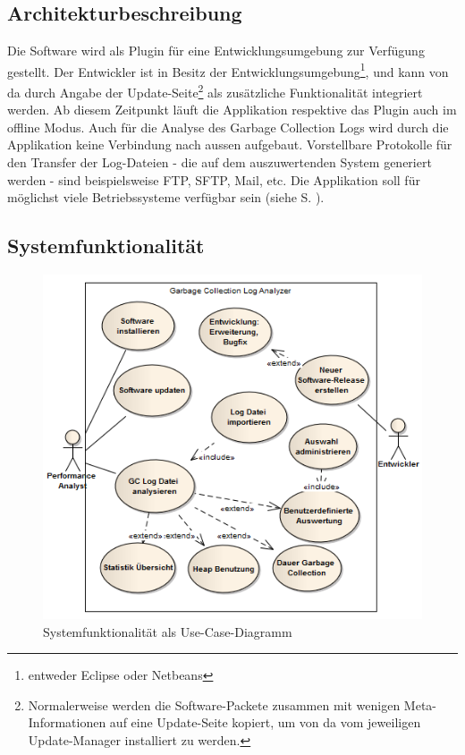 \subsection{Architekturbeschreibung}
Die Software wird als Plugin für eine Entwicklungsumgebung zur Verfügung gestellt. Der Entwickler ist in Besitz der Entwicklungsumgebung\footnote{entweder Eclipse oder Netbeans}, und kann von da durch Angabe der Update-Seite\footnote{Normalerweise werden die Software-Packete zusammen mit wenigen Meta-Informationen auf eine Update-Seite kopiert, um von da vom jeweiligen Update-Manager installiert zu werden.} als zusätzliche Funktionalität integriert werden. Ab diesem Zeitpunkt läuft die Applikation respektive das Plugin auch im offline Modus. Auch für die Analyse des Garbage Collection Logs wird durch die Applikation keine Verbindung nach aussen aufgebaut. Vorstellbare Protokolle für den Transfer der Log-Dateien - die auf dem auszuwertenden System generiert werden - sind beispielsweise FTP, SFTP, Mail, etc. Die Applikation soll für möglichst viele Betriebssysteme verfügbar sein (siehe  S. \pageref{req_plattformunabhaengig}).
\subsection{Systemfunktionalität}\label{systemfunktionalitaet}
 \begin{figure}[H]
  	\centering
        	\caption{Systemfunktionalität als Use-Case-Diagramm}
    	\includegraphics[width=15cm]{images/anforderungen_use-case}
\end{figure}
